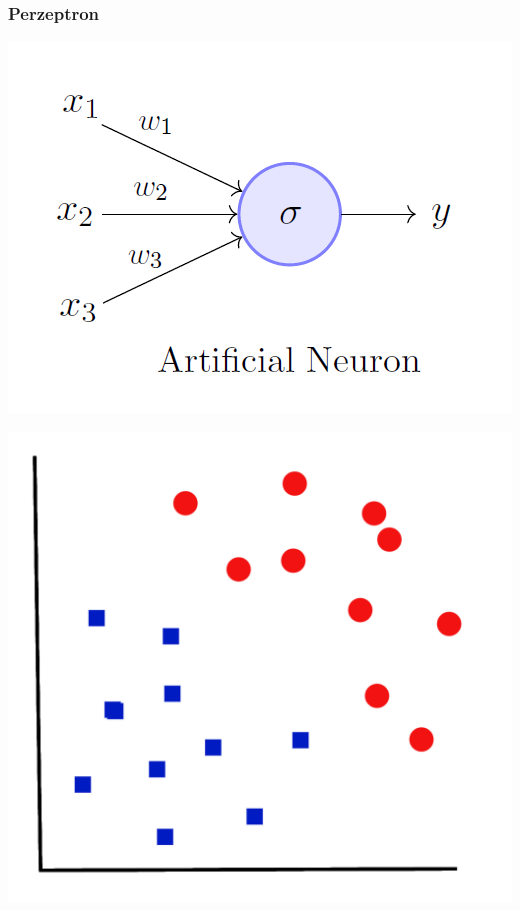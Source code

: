 \documentclass[aspectratio=169,xcolor=dvipsnames]{beamer}
\begin{document}
\begin{frame}
\frametitle{Perzeptron}
\begin{center}
\includegraphics[height=0.82\paperheight,keepaspectratio]{images/perceptron} 
\end{center}
\end{frame}

\begin{frame}
\begin{center}
\includegraphics[height=0.8\paperheight,keepaspectratio]{images/coordinates_points_empty} 
\end{center}
\end{frame}
\end{document}
